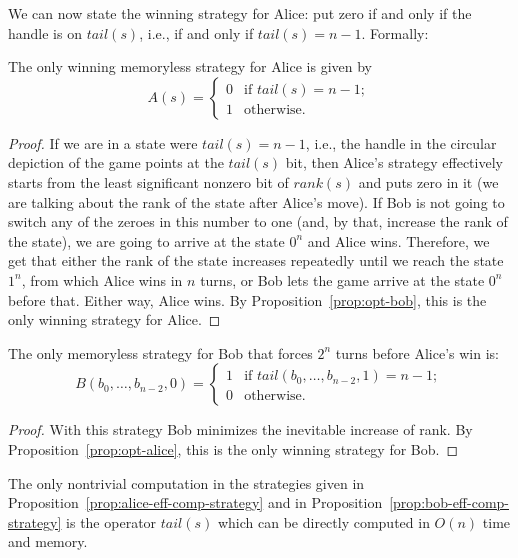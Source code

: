 \documentclass[final,12pt]{elsarticle}
\theoremstyle{definition} \newtheorem{definition}[theorem]{Definition} \newtheorem{observation}[theorem]{Observation} \newtheorem{example}[theorem]{Example} \newtheorem{remark}[theorem]{Remark} \newtheorem{corrolary}[theorem]{Corrolary}
\begin{document}
We can now state the winning strategy for Alice: put zero if and only if the handle is on $tail(s)$, i.e., if and only if $tail(s)=n-1$. Formally:

\begin{proposition}
	The only winning memoryless strategy for Alice is given by  $$A(s) =
		\begin{cases}
			0 &
			\text{if } tail(s)=n-1; \\
			1 &
			\text{otherwise.}
		\end{cases} $$
		\label{prop:alice-eff-comp-strategy}
\end{proposition}
\begin{proof}
	If we are in a state were $tail(s)=n-1$, i.e., the handle in the circular depiction of the game points at the $tail(s)$ bit, then Alice's strategy effectively starts from the least significant nonzero bit of $rank(s)$ and puts zero in it (we are talking about the rank of the state after Alice's move). If Bob is not going to switch any of the zeroes in this number to one (and, by that, increase the rank of the state), we are going to arrive at the state $0^n$ and Alice wins. Therefore, we get that either the rank of the state increases repeatedly until we reach the state $1^n$, from which Alice wins in $n$ turns, or Bob lets the game arrive at the state $0^n$ before that. Either way, Alice wins. By Proposition~\ref{prop:opt-bob}, this is the only winning strategy for Alice.
\end{proof}

\begin{proposition}
	The only memoryless strategy for Bob that forces $2^n$ turns before Alice's win is:
	$$B(b_0,\dots,b_{n-2},0) =
	\begin{cases}
	1 &
	\text{if } tail(b_0,\dots,b_{n-2},1)=n-1; \\
	0 &
	\text{otherwise.}
	\end{cases} $$
	\label{prop:bob-eff-comp-strategy}
\end{proposition}
\begin{proof}
	With this strategy Bob minimizes the inevitable increase of rank. By Proposition~\ref{prop:opt-alice}, this is the only winning strategy for Bob.
\end{proof}

The only nontrivial computation in the strategies given in Proposition~\ref{prop:alice-eff-comp-strategy} and in Proposition~\ref{prop:bob-eff-comp-strategy} is the operator $tail(s)$ which can be directly computed in $O(n)$ time and memory. 
\end{document}

